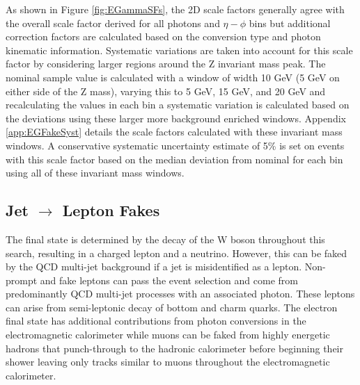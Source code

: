 As shown in Figure \ref{fig:EGammaSFs}, the 2D scale factors generally agree with the overall scale factor derived for all photons and $\eta - \phi$ bins but additional correction factors are calculated based on the conversion type and photon kinematic information.  Systematic variations are taken into account for this scale factor by considering larger regions around the Z invariant mass peak.  The nominal sample value is calculated with a window of width 10 GeV (5 GeV on either side of the Z mass), varying this to 5 GeV, 15 GeV, and 20 GeV and recalculating the values in each bin a systematic variation is calculated based on the deviations using these larger more background enriched windows.  Appendix \ref{app:EGFakeSyst} details the scale factors calculated with these invariant mass windows.  A conservative systematic uncertainty estimate of 5\% is set on events with this scale factor based on the median deviation from nominal for each bin using all of these invariant mass windows.  




\subsection{Jet $\rightarrow$ Lepton Fakes}
\label{sec:FakeLep}
The final state is determined by the decay of the W boson throughout this search, resulting in a charged lepton and a neutrino.  However, this can be faked by the QCD multi-jet background if a jet is misidentified as a lepton.  Non-prompt and fake leptons can pass the event selection and come from predominantly QCD multi-jet processes with an associated photon.  These leptons can arise from semi-leptonic decay of bottom and charm quarks.  The electron final state has additional contributions from photon conversions in the electromagnetic calorimeter while muons can be faked from highly energetic hadrons that punch-through to the hadronic calorimeter before beginning their shower leaving only tracks similar to muons throughout the electromagnetic calorimeter.  

